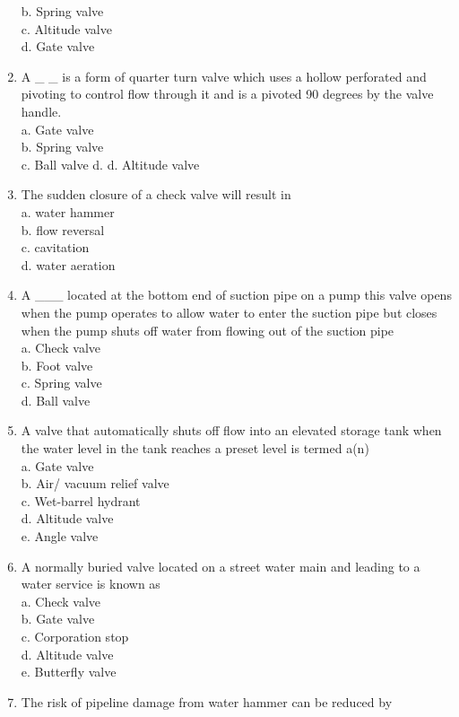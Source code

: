 \begin{enumerate}[1.]
b. Spring valve\\
c. Altitude valve\\
d. Gate valve\\
\item A \_ \_ is a form of quarter turn valve which uses a hollow perforated and pivoting to control flow through it and is a pivoted 90 degrees by the valve handle.\\
a. Gate valve\\
b. Spring valve\\
c. Ball valve d. d. Altitude valve\\
\item The sudden closure of a check valve will result in\\
a. water hammer\\
b. flow reversal\\
c. cavitation\\
d. water aeration\\
\item A \_\_\_ located at the bottom end of suction pipe on a pump this valve opens when the pump operates to allow water to enter the suction pipe but closes when the pump shuts off water from flowing out of the suction pipe\\
a. Check valve\\
b. Foot valve\\
c. Spring valve\\
d. Ball valve\\
\item A valve that automatically shuts off flow into an elevated storage tank when the water level in the tank reaches a preset level is termed a(n)\\
a. Gate valve\\
b. Air/ vacuum relief valve\\
c. Wet-barrel hydrant\\
d. Altitude valve\\
e. Angle valve\\
\item A normally buried valve located on a street water main and leading to a water service is known as\\
a. Check valve\\
b. Gate valve\\
c. Corporation stop\\
d. Altitude valve\\
e. Butterfly valve\\
\item The risk of pipeline damage from water hammer can be reduced by\\

\end{enumerate}
